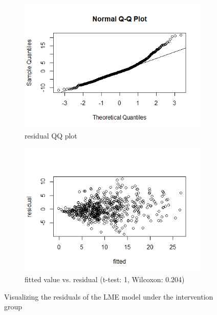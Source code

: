 \begin{figure}[H]
\centering
\begin{subfigure}{.4\textwidth}
  \centering
  \includegraphics[width=1\linewidth]{../../plots/qq_residual_treatment.png}
  \caption{residual QQ plot}
\end{subfigure}
\begin{subfigure}{.4\textwidth}
  \centering
  \includegraphics[width=1\linewidth]{../../plots/residual_treatment.png}
  \caption{fitted value vs. residual (t-test: 1, Wilcoxon: 0.204)}
\end{subfigure}
\caption{Visualizing the residuals of the LME model under the intervention group}
\label{fig:residual.treatment}
\end{figure}

